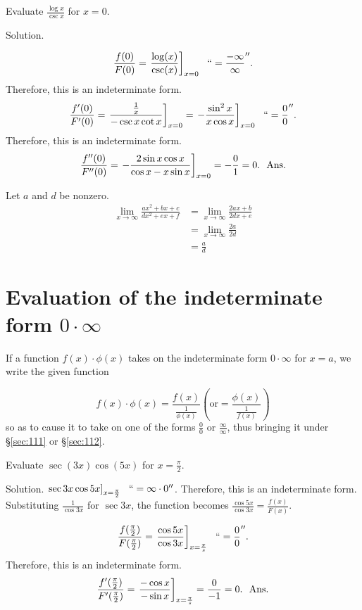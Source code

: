 \begin{example}
Evaluate $\frac{\log x}{\csc x}$ for $x = 0$.

Solution. 

\[
\frac{f(0)}{F(0)} = \left. \frac{\log(x)}{\csc(x)} \right]_{x = 0} 
\ \ ``= \frac{-\infty}{\infty}''. 
\]
Therefore, this is an indeterminate form.
\[
  	\frac{f'(0)}{F'(0)} = \left. \frac{\frac{1}{x}}{-\csc x \cot x} \right]_{x = 0} 
= \left. -\frac{\sin^2 x}{x \cos x} \right]_{x = 0}\ \ ``= \frac{0}{0}''.
\]
Therefore, this is an indeterminate form.
\[
  	\frac{f''(0)}{F''(0)} 
= \left. -\frac{2 \sin x \cos x}{\cos x - x \sin x} \right]_{x = 0} 
= -\frac{0}{1} = 0. \ \ {\rm Ans.}
\]

\end{example}

\begin{example}
{\rm
  Let $a$ and $d$ be nonzero.
  \begin{align*}
    \lim_{x \to \infty} \frac{a x^2 + b x + c}{d x^2 + e x + f}
    &= \lim_{x \to \infty} \frac{2 a x + b}{2 d x + e} \\
    &= \lim_{x \to \infty} \frac{2 a}{2 d} \\
    &= \frac{a}{d}
  \end{align*}
}
\end{example}


\section{Evaluation of the indeterminate form $0 \cdot \infty$}
\label{sec:113}

 If a function $f(x) \cdot \phi(x)$ takes on the indeterminate form 
$0 \cdot \infty$ for $x = a$, we write the given function

\[
f(x) \cdot \phi(x) = \frac{f(x)}{ \frac{1}{\phi(x)} } 
\left( \text{or} = \frac{\phi(x)}{\frac{1}{f(x)}} \right)
\]
so as to cause it to take on one of the forms $\frac{0}{0}$ or 
$\frac{\infty}{\infty}$, thus bringing it under 
\S \ref{sec:111} or \S \ref{sec:112}.

\begin{example}
Evaluate $\sec(3x)\cos(5x)$ for $x = \frac{\pi}{2}$.

Solution. $\left. \sec 3x \cos 5x \right]_{x = \frac{\pi}{2}} \ \ ``= \infty \cdot 0''$.
Therefore, this is an indeterminate form.
Substituting $\frac{1}{\cos 3x}$ for $\sec 3x$, the function 
becomes $\frac{\cos 5x}{\cos 3x} = \frac{f(x)}{F(x)}$.

\[
\frac{ f(\frac{\pi}{2}) }{ F(\frac{\pi}{2}) } 	
= \left. \frac{\cos 5x}{\cos 3x} \right]_{x = \frac{\pi}{s}}\ \ `` = \frac{0}{0}''. 
\]
Therefore, this is an indeterminate form.
\[
\frac{ f'(\frac{\pi}{2}) }{ F'(\frac{\pi}{2}) } 	
= \left. \frac{-\cos x}{- \sin x} \right]_{x = \frac{\pi}{s}} 
= \frac{0}{-1} = 0.\ \ {\rm Ans.}
\]
\end{example}

